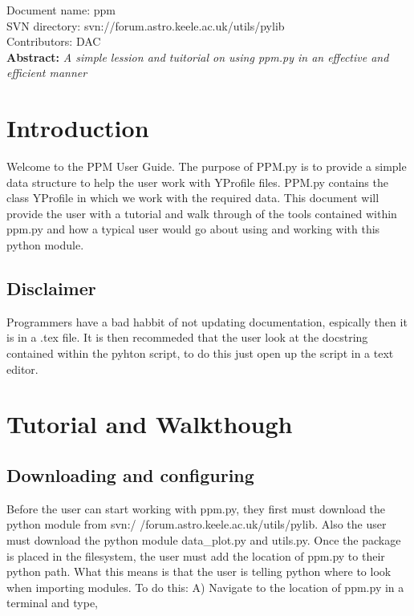 \renewcommand{\ndoctitle}{ppm.py: The YProfile Data Structure Tool} 
\renewcommand{\ndocname}{ppm}                      
\renewcommand{\svndir}{svn://forum.astro.keele.ac.uk/utils/pylib}  
\renewcommand{\ndoccontribs}{DAC}



Document name: \ndocname \\
SVN directory: \svndir\\
Contributors: \ndoccontribs\\



{  \textbf{Abstract:} \slshape
A simple lession and tuitorial on using ppm.py in an effective and efficient manner
}

\section{Introduction}
Welcome to the PPM User Guide.  The purpose of PPM.py is
to provide a simple data structure to help the user work with YProfile files. 
PPM.py contains the class YProfile in which we work with the required data.
This document will provide the user with a 
tutorial and walk through of the tools contained within ppm.py and
how a typical user would go about using and working with this python module.
\subsection{Disclaimer}
Programmers have a bad habbit of not updating documentation, espically then it is in  a .tex file.
It is then recommeded that the user look at the docstring contained within the pyhton script, to
do this just open up the script in a text editor.
\section{Tutorial and Walkthough}

\subsection{Downloading and configuring}
Before the user can start working with ppm.py, they first must download the python 
module from svn:/ /forum.astro.keele.ac.uk/utils/pylib.  Also the user must download the python module data\_plot.py and utils.py. Once the package is placed in the filesystem, the user must add the location
of ppm.py to their python path.  What this means is that the user is telling python where to look when importing modules.
To do this:
\newline
A) Navigate to the location of ppm.py in a terminal and type,

